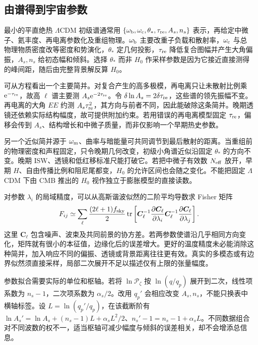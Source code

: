 \subsection{由谱得到宇宙参数}

最小的平直绝热 $\Lambda$CDM 初级谱通常用
$\{\omega_{\rm b},\omega_{\rm c},\theta_*,\tau_{\rm re},A_s,n_s\}$ 表示，再给定中微子、氦丰度、再电离参数化及重组物理。$\omega_{\rm b}$ 主要改重子负载和散射率，$\omega_{\rm c}$ 与总物理物质密度改等密度和势演化，$\theta_*$ 定几何投影，$\tau_{\rm re}$ 降低复合图幅并产生大角偏振，$A_s,n_s$ 给初态幅和倾斜。选择 $\theta_*$ 而非 $H_0$ 作采样参数是因为它接近直接测得的峰间距，随后由完整背景解反算 $H_0$。

可从方程看出一个主要简并。对复合产生的高多极模，再电离只让未散射比例乘 $\mathrm{e}^{-\tau_{\rm re}}$，故高 $\ell$ 谱主要测 $A_s\mathrm{e}^{-2\tau_{\rm re}}$。令 $\delta\ln A_s=2\delta\tau_{\rm re}$，这些谱的领先振幅不变。再电离的大角 $EE$ 约测 $A_s\tau_{\rm re}^2$，其方向与前者不同，因此能破除这条简并。晚期透镜还依赖实际结构幅度，故可提供附加约束。若用错误的再电离模型固定 $\tau_{\rm re}$，偏移会传到 $A_s$、结构增长和中微子质量，而非仅影响一个早期热史参数。

另一个近似简并源于 $\omega_{\rm m}$、曲率与暗能量可共同调节到最后散射的距离。当重组前的物理密度和声程固定，只令晚期几何改变，初级小角谱近似沿固定 $\theta_*$ 的方向不变。晚期 ISW、透镜和低红移标准尺能打破它。若把中微子有效数 $N_{\rm eff}$ 放开，早期 $H$、自由传播比例和阻尼尾都变，$H_0$ 的允许区间也会随之变化。不能把固定 $\Lambda$CDM 下由 CMB 推出的 $H_0$ 视作独立于膨胀模型的直接读数。

对参数 $\lambda_i$ 的局域精度，可以从高斯谐波似然的二阶平均导数求 Fisher 矩阵
\[
 F_{ij}\simeq\sum_\ell\frac{(2\ell+1)f_{\rm sky}}2
 \operatorname{tr}\left[
  \bm C_\ell^{-1}\frac{\partial\bm C_\ell}{\partial\lambda_i}
  \bm C_\ell^{-1}\frac{\partial\bm C_\ell}{\partial\lambda_j}\right].
\]
这里 $\bm C_\ell$ 包含噪声、波束及共同前景的协方差。若两参数使谱沿几乎相同方向变化，矩阵就有很小的本征值，边缘化后的误差增大。更好的温度精度未必能消除这种简并，加入响应不同的偏振、透镜或背景距离往往更有效。真实的多模态或有边界似然须直接采样，局部二次展开不足以描述仅有上限的张量幅度。

参数拟合需要实际的单位和枢轴。若将 $\ln\mathcal P_\zeta$ 按 $\ln(q/q_p)$ 展开到二次，线性项系数为 $n_s-1$，二次项系数为 $\alpha_s/2$。改用 $q_p'$ 会相应改变 $A_s,n_s$，不能只换表中横轴标签。设 $L=\ln(q_p'/q_p)$，在该截断阶有 $\ln A_s'=\ln A_s+(n_s-1)L+\alpha_sL^2/2$、$n_s'-1=n_s-1+\alpha_sL$。不同数据组合对不同波数的权不一，适当枢轴可减少幅度与倾斜的误差相关，却不会增添总信息。

